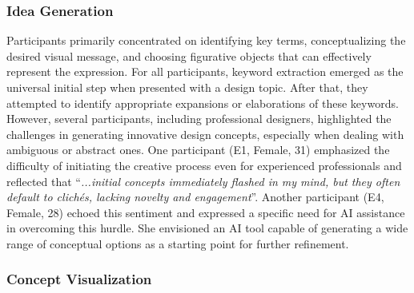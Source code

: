 

\subsubsection{Idea Generation}

Participants primarily concentrated on identifying key terms, conceptualizing the desired visual message, and choosing figurative objects that can effectively represent the expression.
For all participants, keyword extraction emerged as the universal initial step when presented with a design topic.
After that, they attempted to identify appropriate expansions or elaborations of these keywords.
However, several participants, including professional designers, highlighted the challenges in generating innovative design concepts, especially when dealing with ambiguous or abstract ones.
One participant (E1, Female, 31) emphasized the difficulty of initiating the creative process even for experienced professionals and reflected that ``\textit{...initial concepts immediately flashed in my mind, but they often default to clichés, lacking novelty and engagement}''.
Another participant (E4, Female, 28) echoed this sentiment and expressed a specific need for AI assistance in overcoming this hurdle. 
She envisioned an AI tool capable of generating a wide range of conceptual options as a starting point for further refinement.

\subsubsection{Concept Visualization}


